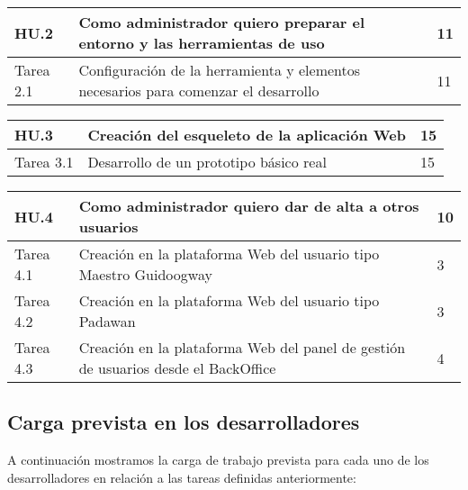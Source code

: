 \begin{table}[h]
	\centering
	\begin{tabular}{| p{2.3cm} | p{6.7cm} | p{2cm} |}
		\rowcolor[HTML]{329A9D} 
		{\color[HTML]{FFFFFF} \textbf{HU.2}} & {\color[HTML]{FFFFFF} \textbf{Como administrador quiero preparar el entorno y las herramientas de uso}} & {\color[HTML]{FFFFFF} \textbf{11}}  \\ \hline
		Tarea 2.1 & Configuración de la herramienta y elementos necesarios para comenzar el desarrollo & 11 \\ \hline
	\end{tabular}
\end{table}

\begin{table}[h]
	\centering
	\begin{tabular}{| p{2.3cm} | p{6.7cm} | p{2cm} |}
		\rowcolor[HTML]{329A9D} 
		{\color[HTML]{FFFFFF} \textbf{HU.3}} & {\color[HTML]{FFFFFF} \textbf{Creación del esqueleto de la aplicación Web}} & {\color[HTML]{FFFFFF} \textbf{15}}  \\ \hline
		Tarea 3.1 & Desarrollo de un prototipo básico real & 15 \\ \hline
	\end{tabular}
\end{table}

\begin{table}[h]
	\centering
	\begin{tabular}{| p{2.3cm} | p{6.7cm} | p{2cm} |}
		\rowcolor[HTML]{329A9D} 
		{\color[HTML]{FFFFFF} \textbf{HU.4}} & {\color[HTML]{FFFFFF} \textbf{Como administrador quiero dar de alta a otros usuarios}} & {\color[HTML]{FFFFFF} \textbf{10}}  \\ \hline
		Tarea 4.1 & Creación en la plataforma Web del usuario tipo Maestro Guidoogway & 3 \\ \hline
		Tarea 4.2 & Creación en la plataforma Web del usuario tipo Padawan & 3 \\ \hline
		Tarea 4.3 & Creación en la plataforma Web del panel de gestión de usuarios desde el BackOffice & 4 \\ \hline
	\end{tabular}
\end{table}

\newpage
\subsection{Carga prevista en los desarrolladores}

A continuación mostramos la carga de trabajo prevista para cada uno de los desarrolladores en relación a las tareas definidas anteriormente:

